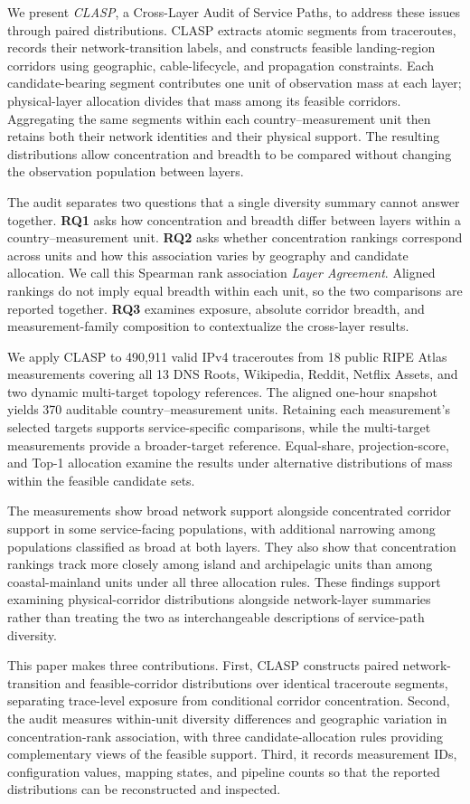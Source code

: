We present \emph{CLASP}, a Cross-Layer Audit of Service Paths, to address
these issues through paired distributions. CLASP extracts atomic segments
from traceroutes, records their network-transition labels, and constructs
feasible landing-region corridors using geographic, cable-lifecycle, and
propagation constraints. Each candidate-bearing segment contributes one
unit of observation mass at each layer; physical-layer allocation divides
that mass among its feasible corridors. Aggregating the same segments
within each country--measurement unit then retains both their network
identities and their physical support. The resulting distributions allow
concentration and breadth to be compared without changing the observation
population between layers.

The audit separates two questions that a single diversity summary cannot
answer together. \textbf{RQ1} asks how concentration and breadth differ
between layers within a country--measurement unit. \textbf{RQ2} asks
whether concentration rankings correspond across units and how this
association varies by geography and candidate allocation. We call this
Spearman rank association \emph{Layer Agreement}. Aligned rankings do not
imply equal breadth within each unit, so the two comparisons are reported
together. \textbf{RQ3} examines exposure, absolute corridor breadth, and
measurement-family composition to contextualize the cross-layer results.

We apply CLASP to 490,911 valid IPv4 traceroutes from 18 public RIPE Atlas
measurements covering all 13 DNS Roots, Wikipedia, Reddit, Netflix Assets,
and two dynamic multi-target topology references. The aligned one-hour
snapshot yields 370 auditable country--measurement units. Retaining each
measurement's selected targets supports service-specific comparisons,
while the multi-target measurements provide a broader-target reference.
Equal-share, projection-score, and Top-1 allocation examine the results
under alternative distributions of mass within the feasible candidate sets.

The measurements show broad network support alongside concentrated
corridor support in some service-facing populations, with additional
narrowing among populations classified as broad at both layers. They also
show that concentration rankings track more closely among island and
archipelagic units than among coastal-mainland units under all three
allocation rules. These findings support examining physical-corridor
distributions alongside
network-layer summaries rather than treating the two as interchangeable
descriptions of service-path diversity.

This paper makes three contributions. First, CLASP constructs paired
network-transition and feasible-corridor distributions over identical
traceroute segments, separating trace-level exposure from conditional
corridor concentration. Second, the audit measures within-unit diversity
differences and geographic variation in concentration-rank association,
with three candidate-allocation rules providing complementary views of
the feasible support. Third, it records measurement IDs, configuration
values, mapping states, and pipeline counts so that the reported
distributions can be reconstructed and inspected.
